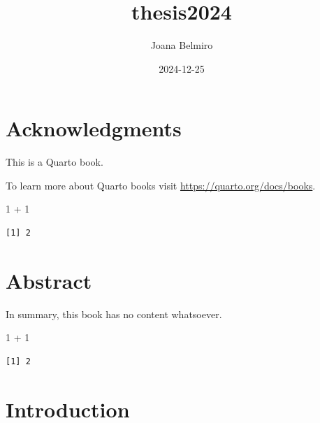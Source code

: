 \documentclass[
  a4paper,
  DIV=11,
  numbers=noendperiod]{scrreprt}
\title{thesis2024}
\author{Joana Belmiro}
\date{2024-12-25}
\newenvironment{Shaded}{\begin{snugshade}}{\end{snugshade}}
\newcommand{\DecValTok}[1]{\textcolor[rgb]{0.68,0.00,0.00}{#1}}
\newcommand{\SpecialCharTok}[1]{\textcolor[rgb]{0.37,0.37,0.37}{#1}}
\renewcommand*\contentsname{Table of contents}
\newcommand\contentsname{Table of contents}
\begin{document}
\maketitle

\renewcommand*\contentsname{Table of contents}
{
\hypersetup{linkcolor=}
\setcounter{tocdepth}{2}
\tableofcontents
}


\chapter*{Acknowledgments}\label{acknowledgments}


This is a Quarto book.

To learn more about Quarto books visit
\url{https://quarto.org/docs/books}.

\begin{Shaded}
\begin{Highlighting}[]
\DecValTok{1} \SpecialCharTok{+} \DecValTok{1}
\end{Highlighting}
\end{Shaded}

\begin{verbatim}
[1] 2
\end{verbatim}


\chapter{Abstract}\label{abstract}

In summary, this book has no content whatsoever.

\begin{Shaded}
\begin{Highlighting}[]
\DecValTok{1} \SpecialCharTok{+} \DecValTok{1}
\end{Highlighting}
\end{Shaded}

\begin{verbatim}
[1] 2
\end{verbatim}


\chapter{Introduction}\label{introduction}
\end{document}
